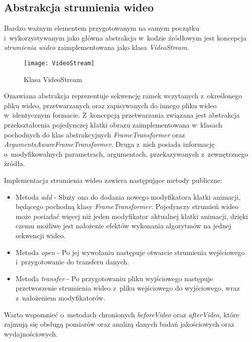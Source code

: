     \subsection{Abstrakcja strumienia wideo}\label{Subsection_VideoStream}

      Bardzo ważnym elementem przygotowanym na samym początku i~wykorzystywanym jako główna abstrakcja w~kodzie źródłowym jest koncepcja \textit{strumienia wideo} zaimplementowana jako klasa \textit{VideoStream}.

        \begin{figure}[!ht]
          \centering
          \texttt{[image: VideoStream]}
          \caption[Klasa VideoStream]{Klasa VideoStream}
          \label{fig:VideoStream}
        \end{figure}

      Omawiana abstrakcja reprezentuje sekwencję ramek wczytanych z~określonego pliku wideo, przetwarzanych oraz zapisywanych do innego pliku wideo w~identycznym formacie. Z~koncepcją przetwarzania związana jest abstrakcja przekształcenia pojedynczej klatki obrazu zaimplementowana w~klasach pochodnych do klas abstrakcyjnych \textit{FrameTransformer} oraz \textit{ArgumentsAwareFrameTransformer}. Druga z~nich posiada informację o~modyfikowalnych parametrach, argumentach, przekazywanych z~zewnętrznego źródła.

      Implementacja strumienia wideo zawiera następujące metody publiczne:
        \begin{itemize}
          \item Metoda \textit{add} - Służy ona do dodania nowego modyfikatora klatki animacji, będącego pochodną klasy \textit{FrameTransformer}. Pojedynczy strumień wideo może posiadać więcej niż jeden modyfikator aktualnej klatki animacji, dzięki czemu możliwe jest nałożenie efektów wykonania algorytmów na jednej sekwencji wideo.
          \item Metoda \textit{open} - Po jej wywołaniu następuje otwarcie strumienia wejściowego i~przygotowanie do transferu danych.
          \item Metoda \textit{transfer} - Po przygotowaniu pliku wyjściowego następuje przetworzenie strumienia wideo z~pliku wejściowego do wyjściowego, wraz z~nałożeniem modyfikatorów.
        \end{itemize}

      Warto wspomnieć o~metodach chronionych \textit{beforeVideo} oraz \textit{afterVideo}, które zajmują się obsługą pomiarów oraz analizą danych badań jakościowych oraz wydajnościowych.

